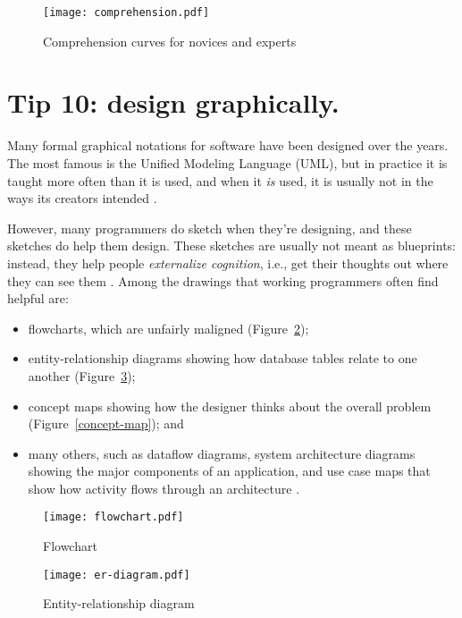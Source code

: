 \documentclass[10pt,letterpaper]{article}
\begin{document}
\begin{figure}
  \centering
  \texttt{[image: comprehension.pdf]}
  \caption{Comprehension curves for novices and experts}
  \label{comprehension}
\end{figure}

\section*{Tip 10: design graphically.}

Many formal graphical notations for software have been designed over the years.
The most famous is the Unified Modeling Language (UML),
but in practice it is taught more often than it is used,
and when it \emph{is} used,
it is usually not in the ways its creators intended \cite{Petre2013}.

However,
many programmers do sketch when they're designing,
and these sketches do help them design.
These sketches are usually not meant as blueprints:
instead,
they help people \emph{externalize cognition},
i.e.,
get their thoughts out where they can see them \cite{Cherubini2007,Petre2016}.
Among the drawings that working programmers often find helpful are:

\begin{itemize}
\item
  flowcharts, which are unfairly maligned \cite{Scanlan1989}
  (Figure~\ref{flowchart});
\item
  entity-relationship diagrams showing how database tables relate to one another
  (Figure~\ref{er-diagram});
\item
  concept maps showing how the designer thinks about the overall problem
  (Figure~\ref{concept-map}); and
\item
  many others,
  such as dataflow diagrams,
  system architecture diagrams showing the major components of an application,
  and use case maps that show how activity flows through an architecture \cite{Reekie2006}.
\end{itemize}

\begin{figure}
  \centering
  \texttt{[image: flowchart.pdf]}
  \caption{Flowchart}
  \label{flowchart}
\end{figure}

\begin{figure}
  \centering
  \texttt{[image: er-diagram.pdf]}
  \caption{Entity-relationship diagram}
  \label{er-diagram}
\end{figure}
\end{document}
